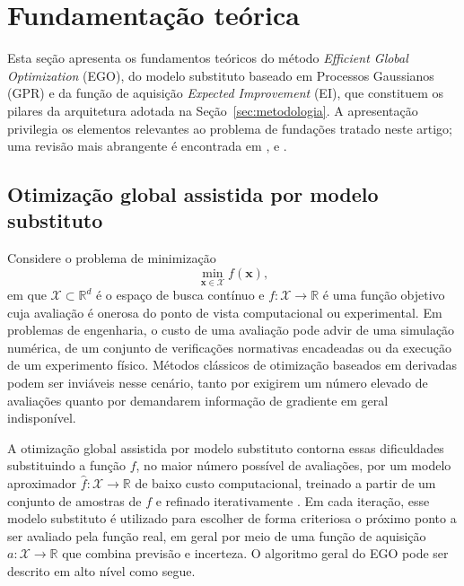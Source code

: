 \section{Fundamentação teórica}
\label{sec:fundamentacao}

Esta seção apresenta os fundamentos teóricos do método \textit{Efficient Global Optimization} (EGO), do modelo substituto baseado em Processos Gaussianos (GPR) e da função de aquisição \textit{Expected Improvement} (EI), que constituem os pilares da arquitetura adotada na Seção~\ref{sec:metodologia}. A apresentação privilegia os elementos relevantes ao problema de fundações tratado neste artigo; uma revisão mais abrangente é encontrada em ,  e .

\subsection{Otimização global assistida por modelo substituto}
\label{sec:fund_ego}

Considere o problema de minimização
\begin{equation}
    \min_{\bm{x} \in \mathcal{X}} f(\bm{x}),
    \label{eq:problema_geral}
\end{equation}
em que $\mathcal{X} \subset \mathbb{R}^d$ é o espaço de busca contínuo e $f: \mathcal{X} \to \mathbb{R}$ é uma função objetivo cuja avaliação é onerosa do ponto de vista computacional ou experimental. Em problemas de engenharia, o custo de uma avaliação pode advir de uma simulação numérica, de um conjunto de verificações normativas encadeadas ou da execução de um experimento físico. Métodos clássicos de otimização baseados em derivadas podem ser inviáveis nesse cenário, tanto por exigirem um número elevado de avaliações quanto por demandarem informação de gradiente em geral indisponível.

A otimização global assistida por modelo substituto contorna essas dificuldades substituindo a função $f$, no maior número possível de avaliações, por um modelo aproximador $\hat{f}: \mathcal{X} \to \mathbb{R}$ de baixo custo computacional, treinado a partir de um conjunto de amostras de $f$ e refinado iterativamente . Em cada iteração, esse modelo substituto é utilizado para escolher de forma criteriosa o próximo ponto a ser avaliado pela função real, em geral por meio de uma função de aquisição $a: \mathcal{X} \to \mathbb{R}$ que combina previsão e incerteza. O algoritmo geral do EGO pode ser descrito em alto nível como segue.

